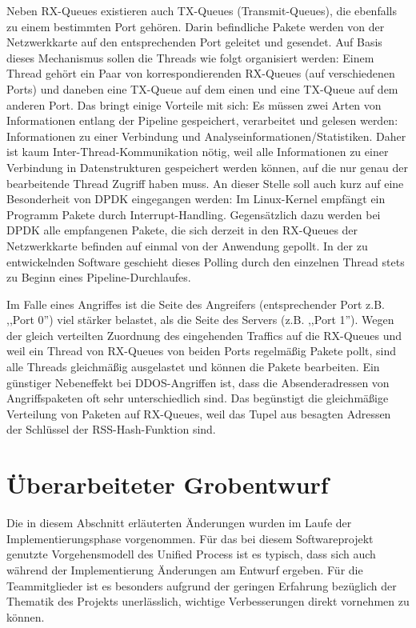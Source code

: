 \documentclass[../review_2.tex]{subfiles}
\begin{document}
Neben RX-Queues existieren auch TX-Queues (Transmit-Queues), die ebenfalls zu einem bestimmten Port gehören. Darin befindliche Pakete werden von der Netzwerkkarte auf den entsprechenden Port geleitet und gesendet. Auf Basis dieses Mechanismus sollen die Threads wie folgt organisiert werden: Einem Thread gehört ein Paar von korrespondierenden RX-Queues (auf verschiedenen Ports) und daneben eine TX-Queue auf dem einen und eine TX-Queue auf dem anderen Port. Das bringt einige Vorteile mit sich: Es müssen zwei Arten von Informationen entlang der Pipeline gespeichert, verarbeitet und gelesen werden: Informationen zu einer Verbindung und Analyseinformationen/Statistiken. Daher ist kaum Inter-Thread-Kommunikation nötig, weil alle Informationen zu einer Verbindung in Datenstrukturen gespeichert werden können, auf die nur genau der bearbeitende Thread Zugriff haben muss. An dieser Stelle soll auch kurz auf eine Besonderheit von DPDK eingegangen werden: Im Linux-Kernel empfängt ein Programm Pakete durch Interrupt-Handling. Gegensätzlich dazu werden bei DPDK alle empfangenen Pakete, die sich derzeit in den RX-Queues der Netzwerkkarte befinden auf einmal von der Anwendung gepollt. In der zu entwickelnden Software geschieht dieses Polling durch den einzelnen Thread stets zu Beginn eines Pipeline-Durchlaufes.

Im Falle eines Angriffes ist die Seite des Angreifers (entsprechender Port z.B. ,,Port 0'') viel stärker belastet, als die Seite des Servers (z.B. ,,Port 1''). Wegen der gleich verteilten Zuordnung des eingehenden Traffics auf die RX-Queues und weil ein Thread von RX-Queues von beiden Ports regelmäßig Pakete pollt, sind alle Threads gleichmäßig ausgelastet und können die Pakete bearbeiten. Ein günstiger Nebeneffekt bei DDOS-Angriffen ist, dass die Absenderadressen von Angriffspaketen oft sehr unterschiedlich sind. Das begünstigt die gleichmäßige Verteilung von Paketen auf RX-Queues, weil das Tupel aus besagten Adressen der Schlüssel der RSS-Hash-Funktion sind.




\section{Überarbeiteter Grobentwurf}

Die in diesem Abschnitt erläuterten Änderungen wurden im Laufe der Implementierungsphase vorgenommen. Für das bei diesem Softwareprojekt genutzte Vorgehensmodell des Unified Process ist es typisch, dass sich auch während der Implementierung Änderungen am Entwurf ergeben. Für die Teammitglieder ist es besonders aufgrund der geringen Erfahrung bezüglich der Thematik des Projekts unerlässlich, wichtige Verbesserungen direkt vornehmen zu können.
\end{document}
